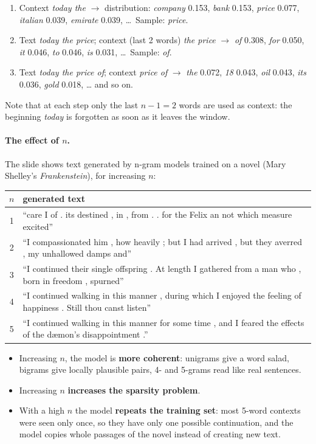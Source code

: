 \begin{enumerate}[nosep]
  \item Context \emph{today the} $\to$ distribution: \emph{company} 0.153,
        \emph{bank} 0.153, \emph{price} 0.077, \emph{italian} 0.039,
        \emph{emirate} 0.039, \ldots\ Sample: \emph{price}.
  \item Text \emph{today the price}; context (last 2 words) \emph{the price} $\to$
        \emph{of} 0.308, \emph{for} 0.050, \emph{it} 0.046, \emph{to} 0.046,
        \emph{is} 0.031, \ldots\ Sample: \emph{of}.
  \item Text \emph{today the price of}; context \emph{price of} $\to$ \emph{the} 0.072,
        \emph{18} 0.043, \emph{oil} 0.043, \emph{its} 0.036, \emph{gold} 0.018, \ldots
        and so on.
\end{enumerate}
Note that at each step only the last $n - 1 = 2$ words are used as context: the
beginning \emph{today} is forgotten as soon as it leaves the window.

\paragraph{The effect of $n$.}
The slide shows text generated by n-gram models trained on a novel (Mary Shelley's
\emph{Frankenstein}), for increasing $n$:
\begin{center}
\small
\begin{tabularx}{\linewidth}{@{}c X@{}}
\toprule
$n$ & generated text \\
\midrule
1 & ``care I of . its destined , in , from . . for the Felix an not which measure excited'' \\
2 & ``I compassionated him , how heavily ; but I had arrived , but they averred , my unhallowed damps and'' \\
3 & ``I continued their single offspring . At length I gathered from a man who , born in freedom , spurned'' \\
4 & ``I continued walking in this manner , during which I enjoyed the feeling of happiness . Still thou canst listen'' \\
5 & ``I continued walking in this manner for some time , and I feared the effects of the dæmon's disappointment .'' \\
\bottomrule
\end{tabularx}
\end{center}
\begin{itemize}[nosep]
  \item Increasing $n$, the model is \textbf{more coherent}: unigrams give a word salad,
        bigrams give locally plausible pairs, 4- and 5-grams read like real sentences.
  \item Increasing $n$ \textbf{increases the sparsity problem}.
  \item With a high $n$ the model \textbf{repeats the training set}: most 5-word
        contexts were seen only once, so they have only one possible continuation, and
        the model copies whole passages of the novel instead of creating new text.
\end{itemize}

